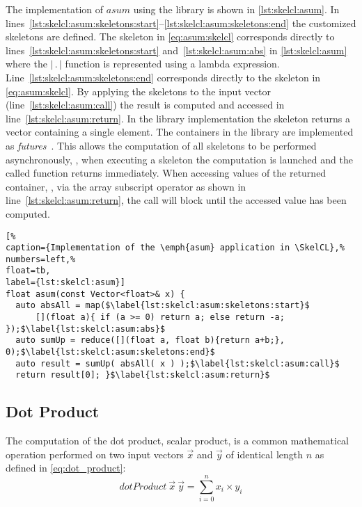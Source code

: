The implementation of $asum$ using the \SkelCL library is shown in \autoref{lst:skelcl:asum}.
In lines~\ref{lst:skelcl:asum:skeletons:start}--\ref{lst:skelcl:asum:skeletons:end} the customized skeletons are defined.
The \map skeleton in \autoref{eq:asum:skelcl} corresponds directly to lines~\ref{lst:skelcl:asum:skeletons:start} and~\ref{lst:skelcl:asum:abs} in \autoref{lst:skelcl:asum} where the $|\, .\, |$ function is represented using a \Cpp lambda expression.
Line~\ref{lst:skelcl:asum:skeletons:end} corresponds directly to the \reduce skeleton in \autoref{eq:asum:skelcl}.
By applying the skeletons to the input vector (line~\ref{lst:skelcl:asum:call}) the result is computed and accessed in line~\ref{lst:skelcl:asum:return}.
In the \SkelCL library implementation the \reduce skeleton returns a vector containing a single element.
The containers in the \SkelCL library are implemented as \emph{futures}~\cite{HewittBa1977,FriedmanWi1978}.
This allows the computation of all skeletons to be performed asynchronously, \ie, when executing a skeleton the computation is launched and the called function returns immediately.
When accessing values of the returned container, \eg, via the array subscript operator as shown in line~\ref{lst:skelcl:asum:return}, the call will block until the accessed value has been computed.

\begin{lstlisting}[%                                                             
caption={Implementation of the \emph{asum} application in \SkelCL},%
numbers=left,%
float=tb,
label={lst:skelcl:asum}]
float asum(const Vector<float>& x) {
  auto absAll = map($\label{lst:skelcl:asum:skeletons:start}$
      [](float a){ if (a >= 0) return a; else return -a; });$\label{lst:skelcl:asum:abs}$
  auto sumUp = reduce([](float a, float b){return a+b;}, 0);$\label{lst:skelcl:asum:skeletons:end}$
  auto result = sumUp( absAll( x ) );$\label{lst:skelcl:asum:call}$
  return result[0]; }$\label{lst:skelcl:asum:return}$
\end{lstlisting}


\subsection*{Dot Product}
\label{sec:dot}
The computation of the dot product, \aka scalar product, is a common mathematical operation performed on two input vectors $\vec{x}$ and $\vec{y}$ of identical length $n$ as defined in \autoref{eq:dot_product}:
\begin{equation}
  dotProduct\ \vec{x}\ \vec{y} = \sum_{i=0}^{n} x_i \times y_i
  \label{eq:dot_product}
\end{equation}


